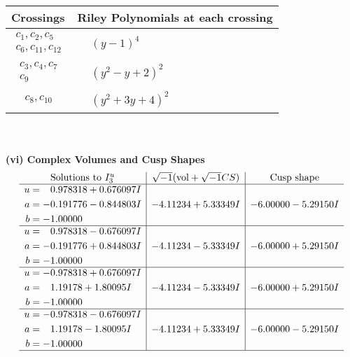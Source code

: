\documentclass[1p]{elsarticle_modified}
\theoremstyle{definition}
\newcommand{\I}{\sqrt{-1}}
\begin{document}
\begin{tabular}{m{50pt}|m{274pt}}
Crossings & \hspace{64pt}Riley Polynomials at each crossing \\
\hline $$\begin{aligned}c_{1},c_{2},c_{5}\\c_{6},c_{11},c_{12}\end{aligned}$$&$\begin{aligned}
&(y-1)^4
\end{aligned}$\\
\hline $$\begin{aligned}c_{3},c_{4},c_{7}\\c_{9}\end{aligned}$$&$\begin{aligned}
&(y^2- y+2)^2
\end{aligned}$\\
\hline $$\begin{aligned}c_{8},c_{10}\end{aligned}$$&$\begin{aligned}
&(y^2+3 y+4)^2
\end{aligned}$\\
\hline
\end{tabular}\\~\\
\newpage\flushleft \textbf{(vi) Complex Volumes and Cusp Shapes}
$$\begin{array}{c|c|c}  
\text{Solutions to }I^u_{3}& \I (\text{vol} + \sqrt{-1}CS) & \text{Cusp shape}\\
 \hline 
\begin{aligned}
u &= \phantom{-}0.978318 + 0.676097 I \\
a &= -0.191776 - 0.844803 I \\
b &= -1.00000\phantom{ +0.000000I}\end{aligned}
 & -4.11234 + 5.33349 I & -6.00000 - 5.29150 I \\ \hline\begin{aligned}
u &= \phantom{-}0.978318 - 0.676097 I \\
a &= -0.191776 + 0.844803 I \\
b &= -1.00000\phantom{ +0.000000I}\end{aligned}
 & -4.11234 - 5.33349 I & -6.00000 + 5.29150 I \\ \hline\begin{aligned}
u &= -0.978318 + 0.676097 I \\
a &= \phantom{-}1.19178 + 1.80095 I \\
b &= -1.00000\phantom{ +0.000000I}\end{aligned}
 & -4.11234 - 5.33349 I & -6.00000 + 5.29150 I \\ \hline\begin{aligned}
u &= -0.978318 - 0.676097 I \\
a &= \phantom{-}1.19178 - 1.80095 I \\
b &= -1.00000\phantom{ +0.000000I}\end{aligned}
 & -4.11234 + 5.33349 I & -6.00000 - 5.29150 I\\
 \hline 
 \end{array}$$\newpage\newpage\renewcommand{\arraystretch}{1}
\end{document}
